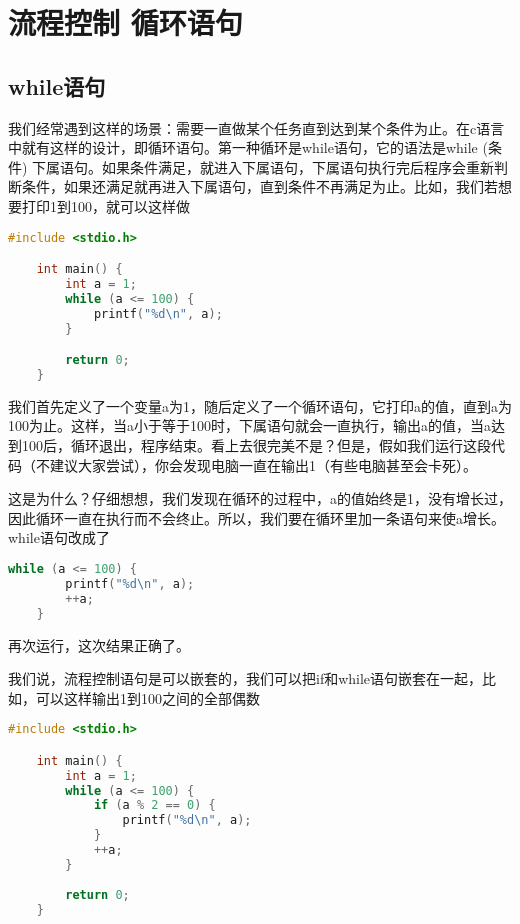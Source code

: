 \section{流程控制 循环语句}

\subsection{while语句}

我们经常遇到这样的场景：需要一直做某个任务直到达到某个条件为止。在c语言中就有这样的设计，即循环语句。第一种循环是while语句，它的语法是while (条件) 下属语句。如果条件满足，就进入下属语句，下属语句执行完后程序会重新判断条件，如果还满足就再进入下属语句，直到条件不再满足为止。比如，我们若想要打印1到100，就可以这样做

\begin{lstlisting}[language=C]
    #include <stdio.h>

    int main() {
        int a = 1;
        while (a <= 100) {
            printf("%d\n", a);
        }

        return 0;
    }
\end{lstlisting}

我们首先定义了一个变量a为1，随后定义了一个循环语句，它打印a的值，直到a为100为止。这样，当a小于等于100时，下属语句就会一直执行，输出a的值，当a达到100后，循环退出，程序结束。看上去很完美不是？但是，假如我们运行这段代码（不建议大家尝试），你会发现电脑一直在输出1（有些电脑甚至会卡死）。

这是为什么？仔细想想，我们发现在循环的过程中，a的值始终是1，没有增长过，因此循环一直在执行而不会终止。所以，我们要在循环里加一条语句来使a增长。while语句改成了

\begin{lstlisting}[language=C]
    while (a <= 100) {
        printf("%d\n", a);
        ++a;
    }
\end{lstlisting}

再次运行，这次结果正确了。

我们说，流程控制语句是可以嵌套的，我们可以把if和while语句嵌套在一起，比如，可以这样输出1到100之间的全部偶数

\begin{lstlisting}[language=C]
    #include <stdio.h>

    int main() {
        int a = 1;
        while (a <= 100) {
            if (a % 2 == 0) {
                printf("%d\n", a);
            }
            ++a;
        }
        
        return 0;
    }
\end{lstlisting}

